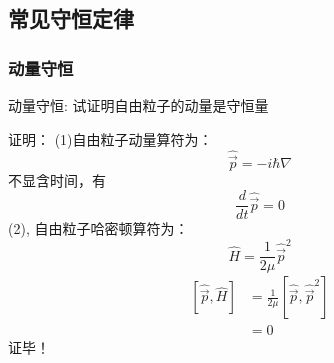 \subsection{常见守恒定律}

\begin{frame} [allowframebreaks=]
    \frametitle{动量守恒} 
    \begin{tcolorbox1}{动量守恒:}
        试证明自由粒子的动量是守恒量                                   
    \end{tcolorbox1}
    \alert{证明：} (1)自由粒子动量算符为：
    $$ \hat{\vec{p}} = -i\hbar\nabla  $$
    不显含时间，有 $$\frac{d}{dt}\hat{\vec{p}}=0$$ 
    (2), 自由粒子哈密顿算符为： $$ \hat{H} = \frac{1}{2\mu} \hat{\vec{p}}^2 $$
    $$\begin{aligned}
        [\hat{\vec{p}},\hat{H}]&= \frac{1}{2\mu}[\hat{\vec{p}}, \hat{\vec{p}}^2 ] \\
        &= 0
    \end{aligned}$$
    证毕！
\end{frame}

